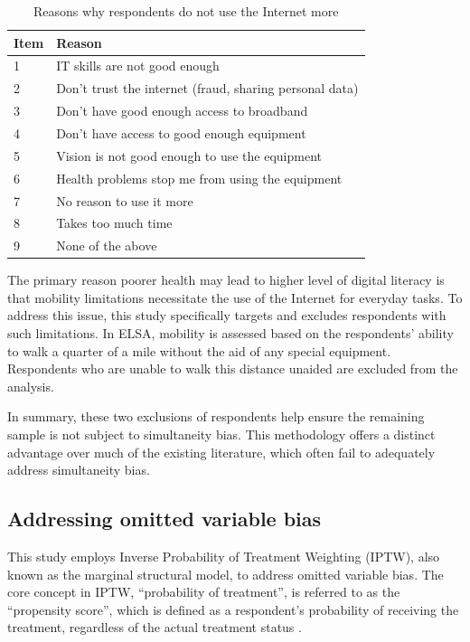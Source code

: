 \begin{table}[h!]
    \centering
    \caption{Reasons why respondents do not use the Internet more}
    \label{tab:reverse_causality}
    \begin{tabular}{ll}
        \toprule
        Item & Reason \\
        \midrule
        1 & IT skills are not good enough \\
        2 & Don't trust the internet (fraud, sharing personal data) \\
        3 & Don't have good enough access to broadband \\
        4 & Don't have access to good enough equipment \\
        5 & Vision is not good enough to use the equipment \\ 
        6 & Health problems stop me from using the equipment \\ 
        7 & No reason to use it more \\
        8 & Takes too much time \\
        9 & None of the above \\
        \bottomrule
    \end{tabular}
\end{table}

The primary reason poorer health may lead to higher level of digital literacy is that mobility limitations necessitate the use of the Internet for everyday tasks. To address this issue, this study specifically targets and excludes respondents with such limitations. In ELSA, mobility is assessed based on the respondents' ability to walk a quarter of a mile without the aid of any special equipment. Respondents who are unable to walk this distance unaided are excluded from the analysis.

In summary, these two exclusions of respondents help ensure the remaining sample is not subject to simultaneity bias. This methodology offers a distinct advantage over much of the existing literature, which often fail to adequately address simultaneity bias.

\subsection{Addressing omitted variable bias}
This study employs Inverse Probability of Treatment Weighting (IPTW), also known as the marginal structural model, to address omitted variable bias. The core concept in IPTW, ``probability of treatment”, is referred to as the ``propensity score”, which is defined as a respondent's probability of receiving the treatment, regardless of the actual treatment status \parencite[p. 80]{angrist_mostly_2009}. 

